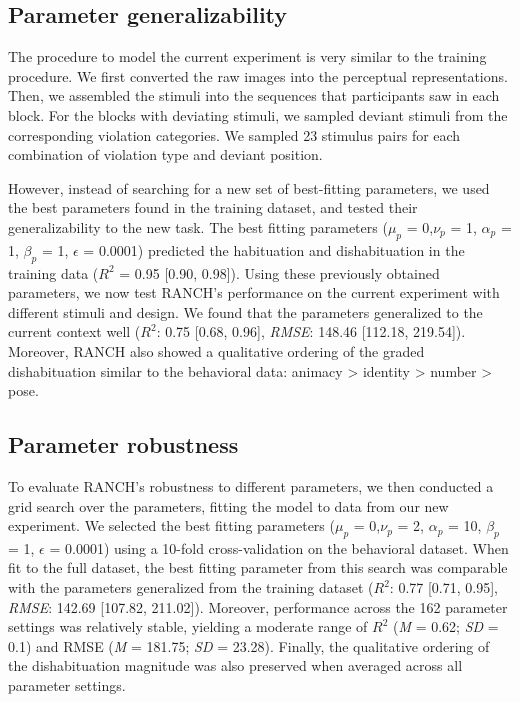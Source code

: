 \documentclass[10pt, letterpaper]{article}
\begin{document}
\hypertarget{parameter-generalizability}{%
\subsection{Parameter
generalizability}\label{parameter-generalizability}}

The procedure to model the current experiment is very similar to the
training procedure. We first converted the raw images into the
perceptual representations. Then, we assembled the stimuli into the
sequences that participants saw in each block. For the blocks with
deviating stimuli, we sampled deviant stimuli from the corresponding
violation categories. We sampled 23 stimulus pairs for each combination
of violation type and deviant position.

However, instead of searching for a new set of best-fitting parameters,
we used the best parameters found in the training dataset, and tested
their generalizability to the new task. The best fitting parameters
(\(\mu_{p}\) = 0,\(\nu_{p}\) = 1, \(\alpha_{p}\) = 1, \(\beta_{p}\) = 1,
\(\epsilon\) = 0.0001) predicted the habituation and dishabituation in
the training data (\(R^2\) = 0.95 {[}0.90, 0.98{]}). Using these
previously obtained parameters, we now test RANCH's performance on the
current experiment with different stimuli and design. We found that the
parameters generalized to the current context well (\(R^2\): 0.75
{[}0.68, 0.96{]}, \emph{RMSE}: 148.46 {[}112.18, 219.54{]}). Moreover,
RANCH also showed a qualitative ordering of the graded dishabituation
similar to the behavioral data: animacy \textgreater{} identity
\textgreater{} number \textgreater{} pose.

\hypertarget{parameter-robustness}{%
\subsection{Parameter robustness}\label{parameter-robustness}}

To evaluate RANCH's robustness to different parameters, we then
conducted a grid search over the parameters, fitting the model to data
from our new experiment. We selected the best fitting parameters
(\(\mu_{p}\) = 0,\(\nu_{p}\) = 2, \(\alpha_{p}\) = 10, \(\beta_{p}\) =
1, \(\epsilon\) = 0.0001) using a 10-fold cross-validation on the
behavioral dataset. When fit to the full dataset, the best fitting
parameter from this search was comparable with the parameters
generalized from the training dataset (\(R^2\): 0.77 {[}0.71, 0.95{]},
\emph{RMSE}: 142.69 {[}107.82, 211.02{]}). Moreover, performance across
the 162 parameter settings was relatively stable, yielding a moderate
range of \(R^2\) (\emph{M} = 0.62; \emph{SD} = 0.1) and RMSE (\emph{M} =
181.75; \emph{SD} = 23.28). Finally, the qualitative ordering of the
dishabituation magnitude was also preserved when averaged across all
parameter settings.
\end{document}
